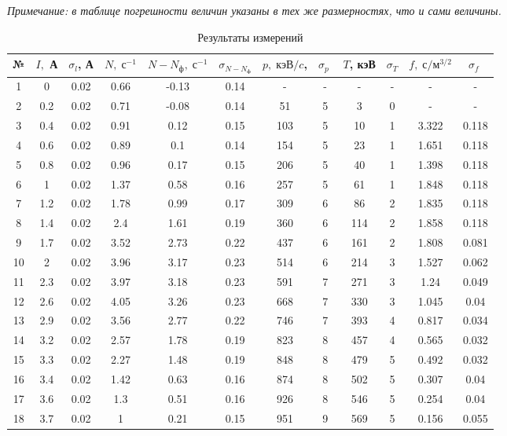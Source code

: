 \documentclass[12pt]{kiarticle}
\begin{document}
\textit{Примечание: в таблице погрешности величин указаны в тех же размерностях, что и сами величины.}

\begin{table}[h!]
	\caption{Результаты измерений}
	\begin{center}
		\begin{tabular}{|c|c|c|c|c|c|c|c|c|c|c|c|}
			\hline
			№ & $ I, $ А & $ \sigma_l $, А & $ N, \; с^{-1} $ & $ N - N_ф,  \; с^{-1} $ & $ \sigma_{N-N_ф}$  & $ p, \; кэВ/c $,  & $ \sigma_p \;  $  & $ T $, кэВ & $ \sigma_T $ & $ f, \; с/м^{3/2 } $& $ \sigma_f \;$\\
			\hline
1 & 0 & 0.02 & 0.66 & -0.13 & 0.14 & - & - & - & - & - &- \\
2 & 0.2 & 0.02 & 0.71 & -0.08 & 0.14 & 51 & 5 & 3 & 0 & - & - \\
3 & 0.4 & 0.02 & 0.91 & 0.12 & 0.15 & 103 & 5 & 10 & 1 & 3.322 & 0.118 \\
4 & 0.6 & 0.02 & 0.89 & 0.1 & 0.14 & 154 & 5 & 23 & 1 & 1.651 & 0.118 \\
5 & 0.8 & 0.02 & 0.96 & 0.17 & 0.15 & 206 & 5 & 40 & 1 & 1.398 & 0.118 \\
6 & 1 & 0.02 & 1.37 & 0.58 & 0.16 & 257 & 5 & 61 & 1 & 1.848 & 0.118 \\
7 & 1.2 & 0.02 & 1.78 & 0.99 & 0.17 & 309 & 6 & 86 & 2 & 1.835 & 0.118 \\
8 & 1.4 & 0.02 & 2.4 & 1.61 & 0.19 & 360 & 6 & 114 & 2 & 1.858 & 0.118 \\
9 & 1.7 & 0.02 & 3.52 & 2.73 & 0.22 & 437 & 6 & 161 & 2 & 1.808 & 0.081 \\
10 & 2 & 0.02 & 3.96 & 3.17 & 0.23 & 514 & 6 & 214 & 3 & 1.527 & 0.062 \\
11 & 2.3 & 0.02 & 3.97 & 3.18 & 0.23 & 591 & 7 & 271 & 3 & 1.24 & 0.049 \\
12 & 2.6 & 0.02 & 4.05 & 3.26 & 0.23 & 668 & 7 & 330 & 3 & 1.045 & 0.04 \\
13 & 2.9 & 0.02 & 3.56 & 2.77 & 0.22 & 746 & 7 & 393 & 4 & 0.817 & 0.034 \\
14 & 3.2 & 0.02 & 2.57 & 1.78 & 0.19 & 823 & 8 & 457 & 4 & 0.565 & 0.032 \\
15 & 3.3 & 0.02 & 2.27 & 1.48 & 0.19 & 848 & 8 & 479 & 5 & 0.492 & 0.032 \\
16 & 3.4 & 0.02 & 1.42 & 0.63 & 0.16 & 874 & 8 & 502 & 5 & 0.307 & 0.04 \\
17 & 3.6 & 0.02 & 1.3 & 0.51 & 0.16 & 926 & 8 & 546 & 5 & 0.254 & 0.04 \\
18 & 3.7 & 0.02 & 1 & 0.21 & 0.15 & 951 & 9 & 569 & 5 & 0.156 & 0.055 \\

\end{tabular}
\end{center}
\end{table}
\end{document}
